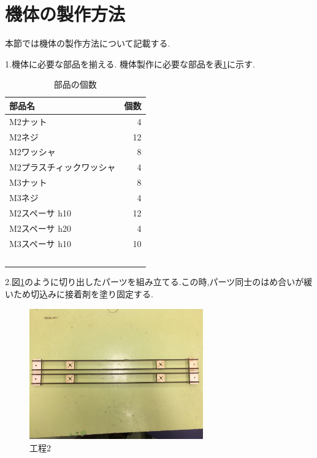 \documentclass[12pt,oneside]{sotsuken_paper}
\begin{document}
\section{機体の製作方法}
本節では機体の製作方法について記載する.


1.機体に必要な部品を揃える.
機体製作に必要な部品を表\ref{table:kitai}に示す.

\begin{table}[htbp]
	\begin{center}
		\caption{部品の個数}
		\begin{tabular}{|l|r|} \hline
			部品名 & 個数 \\ \hline 
			M2ナット & 4 \\ \hline
			M2ネジ & 12 \\ \hline
			M2ワッシャ　& 8　\\ \hline
			M2プラスチィックワッシャ & 4 \\ \hline
			M3ナット & 8 \\ \hline
			M3ネジ　& 4 \\ \hline
			M2スペーサ h10 & 12 \\ \hline
			M2スペーサ h20 & 4 \\ \hline	
			M3スペーサ h10 & 10 \\\hline
　　		\end{tabular}
		\label{table:kitai}
	\end{center}
\end{table}


2.図\ref{fig:kitai1}のように切り出したパーツを組み立てる.この時,パーツ同士のはめ合いが緩いため切込みに接着剤を塗り固定する.

\begin{figure}[htbp]
	\begin{center}
		\includegraphics[width=75mm]{image/kitai/kitai1.jpg}
		\caption{工程2}
		\label{fig:kitai1}
	\end{center}
\end{figure}
\end{document}
